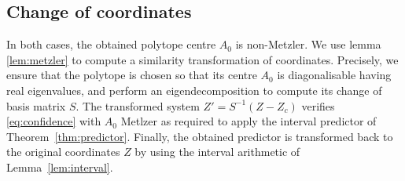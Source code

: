 \documentclass{article}
\begin{document}
\subsection{Change of coordinates}
In both cases, the obtained polytope centre $A_0$ is non-Metzler.
We use lemma \ref{lem:metzler} to compute a similarity transformation of coordinates. Precisely, we ensure that the polytope is chosen so that its centre $A_0$ is diagonalisable having real eigenvalues, and perform an eigendecomposition to compute its change of basis matrix $S$. The transformed system $Z'=S^{-1}(Z-Z_c)$ verifies \eqref{eq:confidence} with $A_0$ Metlzer as required to apply the interval predictor of Theorem~\ref{thm:predictor}. Finally, the obtained predictor is transformed back to the original coordinates $Z$ by using the interval arithmetic of Lemma~\ref{lem:interval}.
\end{document}
